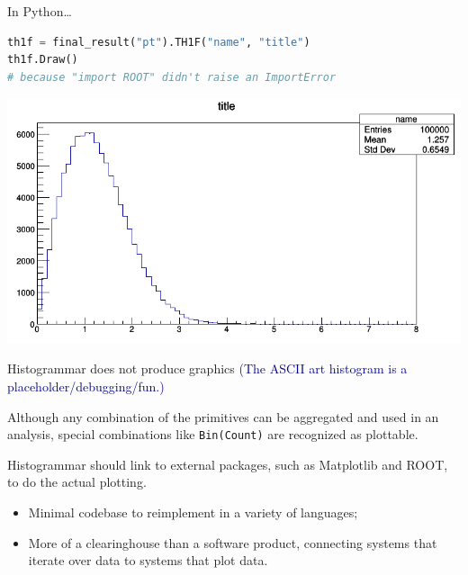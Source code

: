 \documentclass{beamer}
\begin{document}
\begin{frame}[fragile]{In Python\ldots}
\begin{lstlisting}[language=python]
th1f = final_result("pt").TH1F("name", "title")
th1f.Draw()
# because "import ROOT" didn't raise an ImportError
\end{lstlisting}

\includegraphics[width=\linewidth]{root_th1f.png}
\end{frame}

\begin{frame}{Histogrammar does not produce graphics}
\textcolor{darkblue}{\large (The ASCII art histogram is a placeholder/debugging/fun.)}

\vfill
Although any combination of the primitives can be aggregated and used in an analysis, special combinations like {\tt Bin(Count)} are recognized as plottable.

\vfill
Histogrammar should link to external packages, such as Matplotlib and ROOT, to do the actual plotting.
\begin{itemize}
\item Minimal codebase to reimplement in a variety of languages;
\item More of a clearinghouse than a software product, connecting systems that iterate over data to systems that plot data.
\end{itemize}
\end{frame}
\end{document}
